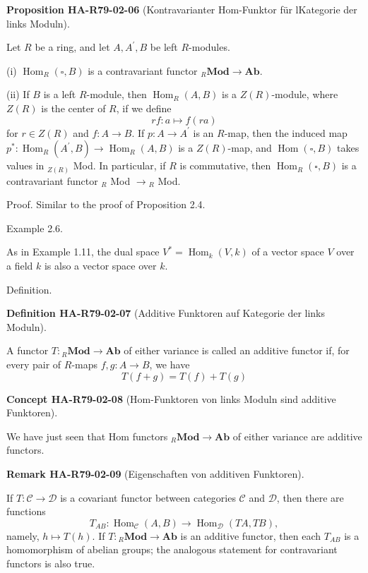 \documentclass[10pt, letterpaper]{article}
\newcommand{\CustomHeading}[3]{%
  \par\medskip\noindent%
  \textbf{#1 #2} \textnormal{(#3)}.\enskip%
}
\newenvironment{DEF}[2]{\begin{unitbox}\CustomHeading{Definition}{#1}{#2}}{\end{unitbox}}
\newenvironment{PROP}[2]{\begin{unitbox}\CustomHeading{Proposition}{#1}{#2}}{\end{unitbox}}
\newenvironment{REM}[2]{\begin{unitbox}\CustomHeading{Remark}{#1}{#2}}{\end{unitbox}}
\newenvironment{CONC}[2]{\begin{unitbox}\CustomHeading{Concept}{#1}{#2}}{\end{unitbox}}
\begin{document}
\begin{PROP}{HA-R79-02-06}{Kontravarianter Hom-Funktor für lKategorie der links Moduln}
Let $R$ be a ring, and let $A, A^{\prime}, B$ be left $R$-modules.

(i) $\operatorname{Hom}_{R}(\square, B)$ is a contravariant functor ${ }_{R} \mathbf{M o d} \rightarrow \mathbf{A b}$.

(ii) If $B$ is a left $R$-module, then $\operatorname{Hom}_{R}(A, B)$ is a $Z(R)$-module, where $Z(R)$ is the center of $R$, if we define
$$
r f: a \mapsto f(r a)
$$
for $r \in Z(R)$ and $f: A \rightarrow B$. If $p: A \rightarrow A^{\prime}$ is an $R$-map, then the induced map $p^{*}: \operatorname{Hom}_{R}\left(A^{\prime}, B\right) \rightarrow \operatorname{Hom}_{R}(A, B)$ is a $Z(R)$-map, and $\operatorname{Hom}(\square, B)$ takes values in ${ }_{Z(R)}$ Mod. In particular, if $R$ is commutative, then $\operatorname{Hom}_{R}(\square, B)$ is a contravariant functor ${ }_{R}$ Mod $\rightarrow{ }_{R}$ Mod.
\end{PROP}


Proof. Similar to the proof of Proposition 2.4.



Example 2.6. 

As in Example 1.11, the dual space $V^{*}=\operatorname{Hom}_{k}(V, k)$ of a vector space $V$ over a field $k$ is also a vector space over $k$.


Definition. 


\begin{DEF}{HA-R79-02-07}{Additive Funktoren auf Kategorie der links Moduln}
A functor $T:{ }_{R} \mathbf{M o d} \rightarrow \mathbf{A b}$ of either variance is called an additive functor if, for every pair of $R$-maps $f, g: A \rightarrow B$, we have
$$
T(f+g)=T(f)+T(g)
$$
\end{DEF}



\begin{CONC}{HA-R79-02-08}{Hom-Funktoren von links Moduln sind additive Funktoren}
We have just seen that Hom functors ${ }_{R} \mathbf{M o d} \rightarrow \mathbf{A b}$ of either variance are additive functors.
\end{CONC} 

\begin{REM}{HA-R79-02-09}{Eigenschaften von additiven Funktoren}
If $T: \mathcal{C} \rightarrow \mathcal{D}$ is a covariant functor between categories $\mathcal{C}$ and $\mathcal{D}$, then there are functions
$$
T_{A B}: \operatorname{Hom}_{\mathcal{C}}(A, B) \rightarrow \operatorname{Hom}_{\mathcal{D}}(T A, T B),
$$
namely, $h \mapsto T(h)$. If $T:{ }_{R} \mathbf{M o d} \rightarrow \mathbf{A b}$ is an additive functor, then each $T_{A B}$ is a homomorphism of abelian groups; the analogous statement for contravariant functors is also true.
\end{REM}
\end{document}

